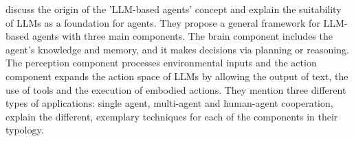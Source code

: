 \documentclass{article}
\begin{document}
\cite{xi_rise_2023} discuss the origin of the 'LLM-based agents' concept and explain the suitability of LLMs as a foundation for agents. They propose a general framework for LLM-based agents with three main components.
The brain component includes the agent's knowledge and memory, and it makes decisions via planning or reasoning. The perception component processes environmental inputs and the action component expands the action space of LLMs by allowing the output of text, the use of tools and the execution of embodied actions. They mention three different types of applications: single agent, multi-agent and human-agent cooperation, explain the different, exemplary techniques for each of the components in their typology. 


\end{document}
